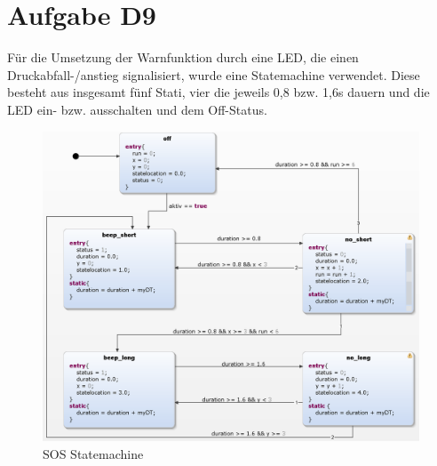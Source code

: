 
\chapter{Aufgabe D9}
Für die Umsetzung der Warnfunktion durch eine LED, die einen Druckabfall-/anstieg signalisiert, wurde eine Statemachine verwendet. Diese besteht aus insgesamt fünf Stati, vier die jeweils 0,8 bzw. 1,6s dauern und die LED ein- bzw. ausschalten und dem Off-Status.

\begin{figure}[h!]
	\centering
	\includegraphics[width=1\linewidth]{../Graphiken/SOS_state.png}
	\caption{SOS Statemachine}
	\label{fig:SOS_state}
\end{figure}